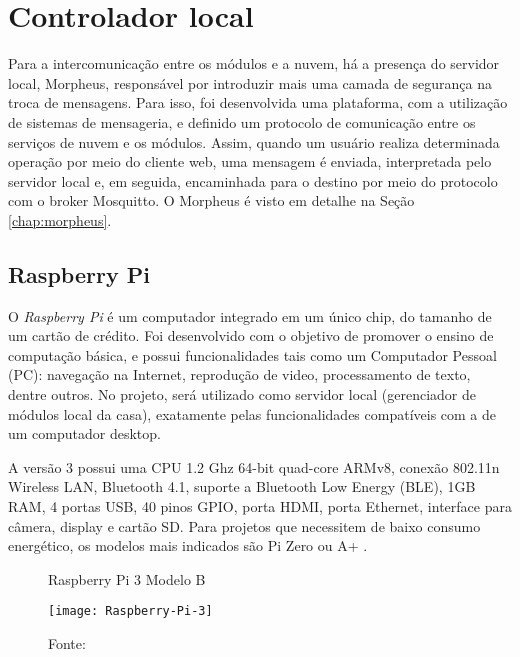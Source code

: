 \section{Controlador local}
Para a intercomunicação entre os módulos e a nuvem, há a presença do servidor local, Morpheus, responsável por introduzir mais uma camada de segurança na troca de mensagens. Para isso, foi desenvolvida uma plataforma, com a utilização de sistemas de mensageria, e definido um protocolo de comunicação entre os serviços de nuvem e os módulos. Assim, quando um usuário realiza determinada operação por meio do cliente web, uma mensagem é enviada, interpretada pelo servidor local e, em seguida, encaminhada para o destino por meio do protocolo \wmqtt{} com o broker Mosquitto. O Morpheus é visto em detalhe na Seção \ref{chap:morpheus}.

\subsection{Raspberry Pi}
O \emph{Raspberry Pi} é um computador integrado em um único chip, do tamanho de um cartão de crédito. Foi desenvolvido com o objetivo de promover o ensino de computação básica, e possui funcionalidades tais como um Computador Pessoal (PC): navegação na Internet, reprodução de video, processamento de texto, dentre outros. No projeto, será utilizado como servidor local (gerenciador de módulos local da casa), exatamente pelas funcionalidades compatíveis com a de um computador desktop.

A versão 3 possui uma CPU 1.2 Ghz 64-bit quad-core ARMv8, conexão 802.11n Wireless LAN, Bluetooth 4.1, suporte a Bluetooth Low Energy (BLE), 1GB RAM, 4 portas USB, 40 pinos GPIO, porta HDMI, porta Ethernet, interface para câmera, display e cartão SD. Para projetos que necessitem de baixo consumo energético, os modelos mais indicados são Pi Zero ou A+ \cite{raspPi}.

\begin{figure}[H]
	\centering
	\caption{Raspberry Pi 3 Modelo B}
  \texttt{[image: Raspberry-Pi-3]}
	\caption*{Fonte: \cite{raspPi}}
\label{fig:Raspberry-Pi-3}
\end{figure}
